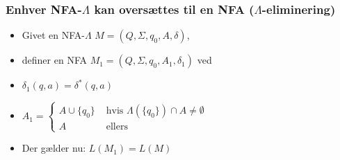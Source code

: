 \begin{frame}
\frametitle{Enhver NFA-$\Lambda $ kan oversættes til en NFA
($\Lambda $-eliminering)}
\begin{itemize}[<+->]
\item Givet en NFA-$\Lambda $ $M=(Q, \Sigma , q_0, A, \delta )$, 
\item definer en NFA $M_1=(Q, \Sigma , q_0, A_1, \delta _1)$ ved
\item $\delta _1(q, a) =  \delta ^*(q, a)$
\item $A_1 =
  \begin{cases}
    A \cup \{ q_0\} & \text{ hvis } \Lambda(\{q_0\})\cap A \neq \emptyset \\
    A & \text{ ellers }
  \end{cases}
$
\item Der gælder nu: $L(M_1) = L(M)$
\end{itemize}
\end{frame}
